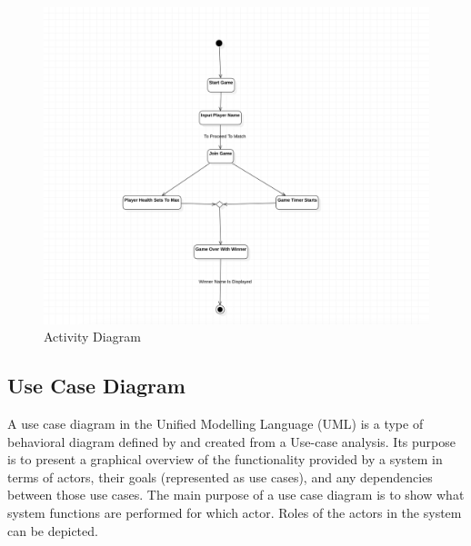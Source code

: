 \documentclass[12pt]{report}
\begin{document}
\setlength{\parindent}{0em}
\setlength{\parskip}{0em}
\renewcommand{\baselinestretch}{1.5}
\vspace{0.5cm}
\begin{figure}[h]
\centering
\includegraphics[scale=0.5]{Activity.png}
\caption{ Activity Diagram}
\label{ Activity Diagram}
\end{figure}
\vspace{0.1cm}

\justifying
\setlength{\parindent}{4em}
\setlength{\parskip}{0.5em}
\renewcommand{\baselinestretch}{1.5}
\normalsize
\subsection{Use Case Diagram}
A use case diagram in the Unified Modelling Language (UML) is a type of behavioral
diagram defined by and created from a Use-case analysis. Its purpose is to present a graphical 
overview of the functionality provided by a system in terms of actors, their goals 
(represented as use cases), and any dependencies between those use cases. The main purpose 
of a use case diagram is to show what system functions are performed for which actor. Roles 
of the actors in the system can be depicted.
\end{document}
